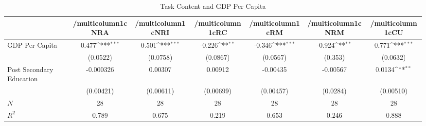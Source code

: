 \begin{table}[htbp]\centering
\def\sym#1{\ifmmode^{#1}\else\(^{#1}\)\fi}
\caption{Task Content and GDP Per Capita}
\begin{tabular}{l*{6}{c}}
\hline\hline
            &/multicolumn{1}{c}{NRA}&/multicolumn{1}{c}{NRI}&/multicolumn{1}{c}{RC}&/multicolumn{1}{c}{RM}&/multicolumn{1}{c}{NRM}&/multicolumn{1}{c}{CU}\\
\hline
GDP Per Capita&       0.477\sym{***}&       0.501\sym{***}&      -0.226\sym{**} &      -0.346\sym{***}&      -0.924\sym{**} &       0.771\sym{***}\\
            &    (0.0522)         &    (0.0758)         &    (0.0867)         &    (0.0567)         &     (0.353)         &    (0.0632)         \\
[1em]
Post Secondary Education&   -0.000326         &     0.00307         &     0.00912         &    -0.00435         &    -0.00567         &      0.0134\sym{**} \\
            &   (0.00421)         &   (0.00611)         &   (0.00699)         &   (0.00457)         &    (0.0284)         &   (0.00510)         \\
\hline
\(N\)       &          28         &          28         &          28         &          28         &          28         &          28         \\
\(R^{2}\)   &       0.789         &       0.675         &       0.219         &       0.653         &       0.246         &       0.888         \\
\hline\hline
\end{tabular}
\end{table}
